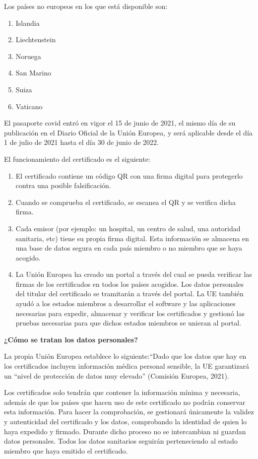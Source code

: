 \documentclass[11pt,a4paper,spanish]{article}
\begin{document}
Los países no europeos en los que está disponible son:

\begin{enumerate}
\item Islandia
\item Liechtenstein
\item Noruega
\item San Marino
\item Suiza
\item Vaticano
\end{enumerate}

El pasaporte covid entró en vigor el 15 de junio de 2021, el mismo día de su publicación en el Diario Oficial de la Unión Europea, y será aplicable desde el día 1 de julio de 2021 hasta el día 30 de junio de 2022.

El funcionamiento del certificado es el siguiente:

\begin{enumerate}
\item El certificado contiene un código QR con una firma digital para protegerlo contra una posible falsificación.
\item Cuando se comprueba el certificado, se escanea el QR y se verifica dicha firma.
\item Cada emisor (por ejemplo: un hospital, un centro de salud, una autoridad sanitaria, etc) tiene su propia firma digital. Esta información se almacena en una base de datos segura en cada país miembro o no miembro que se haya acogido.
\item La Unión Europea ha creado un portal a través del cual se pueda verificar las firmas de los certificados en todos los países acogidos. Los datos personales del titular del certificado se tramitarán a través del portal. La UE también ayudó a los estados miembros a desarrollar el software y las aplicaciones necesarias para expedir, almacenar y verificar los certificados y gestionó las pruebas necesarias para que dichos estados miembros se unieran al portal.
\end{enumerate}

\textbf{¿Cómo se tratan los datos personales?}

La propia Unión Europea establece lo siguiente:“Dado que los datos que hay en los certificados incluyen información médica personal sensible, la UE garantizará un “nivel de protección de datos muy elevado” (Comisión Europea, 2021).

Los certificados solo tendrán que contener la información mínima y necesaria, además de que los países que hacen uso de este certificado no podrán conservar esta información. Para hacer la comprobación, se gestionará únicamente la validez y autenticidad del certificado y los datos, comprobando la identidad de quien lo haya expedido y firmado. Durante dicho proceso no se intercambian ni guardan datos personales. Todos los datos sanitarios seguirán perteneciendo al estado miembro que haya emitido el certificado.
\end{document}
